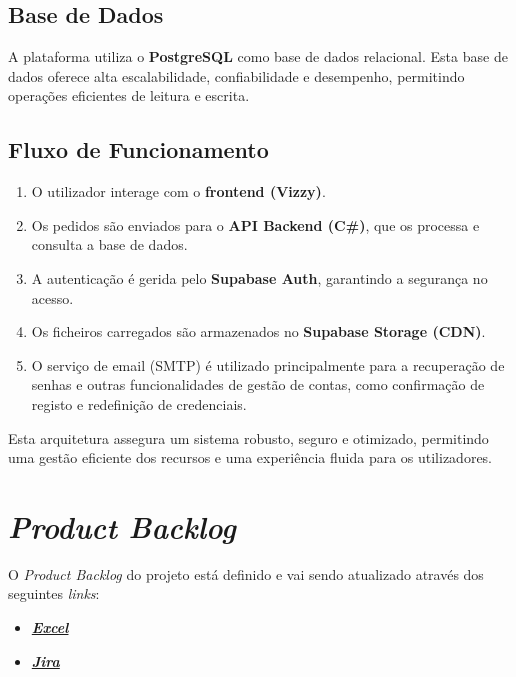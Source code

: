 \documentclass[a4paper, 12pt]{article} %
\begin{document}
\subsection{Base de Dados}
A plataforma utiliza o \textbf{PostgreSQL} como base de dados relacional. Esta base de dados oferece alta escalabilidade, confiabilidade e desempenho, permitindo operações eficientes de leitura e escrita.

\subsection{Fluxo de Funcionamento}
\begin{enumerate}
	\item O utilizador interage com o \textbf{frontend (Vizzy)}.
	\item Os pedidos são enviados para o \textbf{API Backend (C\#)}, que os processa e consulta a base de dados.
	\item A autenticação é gerida pelo \textbf{Supabase Auth}, garantindo a segurança no acesso.
	\item Os ficheiros carregados são armazenados no \textbf{Supabase Storage (CDN)}.
	\item O serviço de email (SMTP) é utilizado principalmente para a recuperação de senhas e outras funcionalidades de gestão de contas, como confirmação de registo e redefinição de credenciais.
\end{enumerate}

Esta arquitetura assegura um sistema robusto, seguro e otimizado, permitindo uma gestão eficiente dos recursos e uma experiência fluida para os utilizadores.

\newpage
\section*{\textit{Product Backlog}}

O \textit{Product Backlog} do projeto está definido e vai sendo atualizado através dos seguintes \textit{links}:
\begin{itemize} 
	\item\href{https://ipcapt-my.sharepoint.com/:x:/g/personal/nfr\_ipca\_pt/Eb29k3z-aWRGisXGIZopL6IBy5l5QZjY8SjG1iWQDl6c7w?rtime=jE\_b04Za3Ug}{\textbf{\textit{Excel}}}
	\item\href{https://basigraphics.atlassian.net/jira/software/projects/VIZZY/boards/1/backlog?epics=visible&atlOrigin=eyJpIjoiOGNmZTQ2MDRmNjQ1NDY0NDgwNDk0MDJiMGM0MDdlZWYiLCJwIjoiaiJ9}{\textbf{\textit{Jira}}}
	
\end{itemize}
\end{document}

